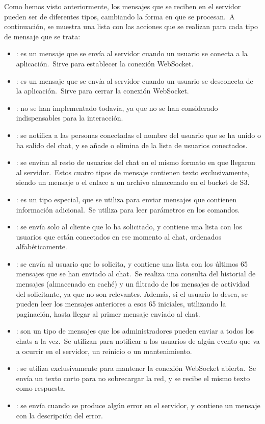 
Como hemos visto anteriormente, los mensajes que se reciben en el servidor pueden ser de diferentes tipos,
cambiando la forma en que se procesan.\ A continuación, se muestra una lista con las acciones que se realizan para
cada tipo de mensaje que se trata:

\begin{itemize}
	\item {}: es un mensaje que se envía al servidor cuando un usuario se conecta a la
	aplicación.\ Sirve para establecer la conexión WebSocket.
	\item {}: es un mensaje que se envía al servidor cuando un usuario se desconecta de la
	aplicación.\ Sirve para cerrar la conexión WebSocket.
	\item {}: no se han implementado todavía, ya que no se han considerado
	indispensables para la interacción.
	\item {}: se notifica a las personas conectadas el nombre del usuario que se ha
	unido o ha
	salido del chat, y se añade o elimina de la lista de usuarios conectados.
	\item {}: se envían al resto de usuarios del chat en el mismo
	formato en que llegaron al
	servidor.\ Estos cuatro tipos de mensaje contienen texto exclusivamente, siendo un mensaje o el enlace a un
	archivo almacenado en el bucket de S3.
	\item {}: es un tipo especial, que se utiliza para enviar mensajes que contienen información
	adicional.\ Se utiliza para leer parámetros en los comandos.
	\item {}: se envía solo al cliente que lo ha solicitado, y contiene una lista con los usuarios
	que están conectados en ese momento al chat, ordenados alfabéticamente.
	\item {}: se envía al usuario que lo solicita, y contiene una lista con los últimos 65 mensajes
	que se han enviado al chat.\ Se realiza una consulta del historial de mensajes (almacenado en caché)
	y un filtrado de los mensajes de actividad del solicitante, ya que no son relevantes.
	Además, si el usuario lo desea, se pueden leer los mensajes anteriores a esos 65 iniciales, utilizando
	la paginación, hasta llegar al primer mensaje enviado al chat.
	\item {}: son un tipo de mensajes que los administradores pueden enviar a todos
	los chats a la vez.\ Se utilizan para notificar a los usuarios de algún evento que va a ocurrir en el servidor,
	un reinicio o un mantenimiento.
	\item {}: se utiliza exclusivamente para mantener la conexión WebSocket abierta.\ Se envía un texto
	corto para no sobrecargar la red, y se recibe el mismo texto como respuesta.
	\item {}: se envía cuando se produce algún error en el servidor, y contiene un mensaje con la
	descripción del error.
\end{itemize}
